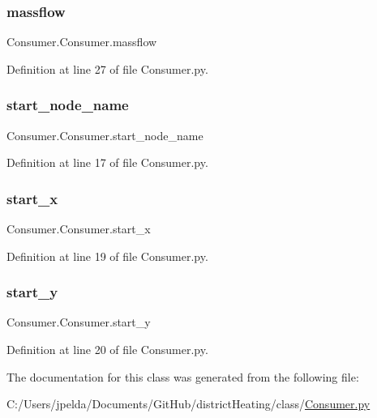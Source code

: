 \subsubsection{\texorpdfstring{massflow}{massflow}}
{\footnotesize\ttfamily Consumer.\+Consumer.\+massflow}



Definition at line 27 of file Consumer.\+py.

\mbox{\label{class_consumer_1_1_consumer_a7260abfc8da45b0de6dd3907e9f1d0c7}} 
\subsubsection{\texorpdfstring{start\+\_\+node\+\_\+name}{start\_node\_name}}
{\footnotesize\ttfamily Consumer.\+Consumer.\+start\+\_\+node\+\_\+name}



Definition at line 17 of file Consumer.\+py.

\mbox{\label{class_consumer_1_1_consumer_a2b4e4c75066ac9e44f1c878608f5b8d6}} 
\subsubsection{\texorpdfstring{start\+\_\+x}{start\_x}}
{\footnotesize\ttfamily Consumer.\+Consumer.\+start\+\_\+x}



Definition at line 19 of file Consumer.\+py.

\mbox{\label{class_consumer_1_1_consumer_a3e90aa467f71be63160bfa466e1c9d2b}} 
\subsubsection{\texorpdfstring{start\+\_\+y}{start\_y}}
{\footnotesize\ttfamily Consumer.\+Consumer.\+start\+\_\+y}



Definition at line 20 of file Consumer.\+py.



The documentation for this class was generated from the following file\+:\begin{DoxyCompactItemize}
\item 
C\+:/\+Users/jpelda/\+Documents/\+Git\+Hub/district\+Heating/class/\hyperlink{_consumer_8py}{Consumer.\+py}\end{DoxyCompactItemize}
